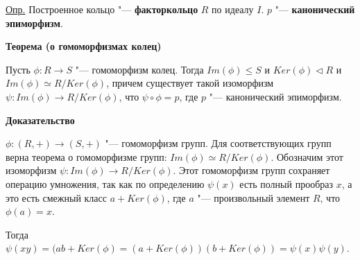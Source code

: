 \documentclass{article}
\begin{document}
\vspace{10pt}

\underline{Опр.} Построенное кольцо "--- \textbf{факторкольцо} $R$ по идеалу $I$. $p$ "--- \textbf{канонический эпиморфизм}.

\vspace{10pt}

\textbf{Теорема (о гомоморфизмах колец)}

Пусть $\phi: R \rightarrow S$ "--- гомоморфизм колец. Тогда $Im(\phi) \leq S$ и $Ker(\phi) \triangleleft R$ и $Im(\phi) \simeq R / Ker(\phi)$, причем существует такой изоморфизм $\psi: Im(\phi) \rightarrow R / Ker(\phi)$, что $\psi \circ \phi = p$, где $p$ "--- канонический эпиморфизм.

\vspace{5pt}

\textbf{Доказательство}

$\phi: (R, +) \rightarrow (S, +)$ "--- гомоморфизм групп. Для соответствующих групп верна теорема о гомоморфизме групп: $Im(\phi) \simeq R / Ker(\phi)$. Обозначим этот изоморфизм $\psi: Im(\phi) \rightarrow R / Ker(\phi)$. Этот гомоморфизм групп сохраняет операцию умножения, так как по определению $\psi(x)$ есть полный прообраз $x$, а это есть смежный класс $a + Ker(\phi)$, где $a$ "--- произвольный элемент $R$, что $\phi(a) = x$. 

Тогда $\psi(xy) = (ab + Ker(\phi) = (a + Ker(\phi))(b + Ker(\phi)) = \psi(x)\psi(y)$.
\end{document}
